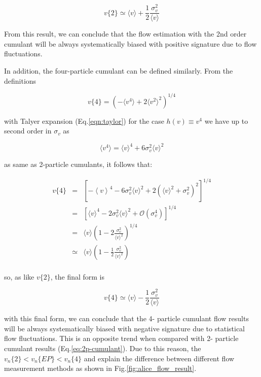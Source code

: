\begin{equation}
	v\{2\} \simeq \langle v \rangle + \frac{1}{2} \frac{\sigma_v^2}{\langle v \rangle}
	\label{eq:2p-cumulant}
\end{equation}

From this result, we can conclude that the flow estimation with the 2nd order cumulant will be always systematically biased with positive signature due to flow fluctuations.

In addition, the four-particle cumulant can be defined similarly. From the definitions

\begin{equation}
	v\{4\} = ( -\langle v^4 \rangle + 2\langle v^2 \rangle ^2 )^{1/4}
\end{equation}

with Talyer expansion (Eq.\ref{eqn:taylor}) for the case $h(v) \equiv v^4$ we have up to second order in $\sigma_v$ as

\begin{equation}
	\langle v^4 \rangle = \langle v \rangle^4 + 6\sigma_v^2\langle v \rangle ^2 
\end{equation}

as same as 2-particle cumulants, it follows that:

\begin{eqnarray}
	v\{4\} &=& \left[ -\left\langle v \right\rangle^4 - 6 \sigma_v^2 \langle v \rangle^2 + 2\left( \langle v \rangle^2 + \sigma_v^2 \right)^2 \right]^{1/4} \\
	&=& \left[ \langle v \rangle^4 - 2 \sigma_v^2 \langle v \rangle ^2 + \mathcal{O}(\sigma_v^4) \right]^{1/4} \\
	&=& \langle v \rangle \left(1 - 2 \frac{\sigma_v^2}{\langle v \rangle^2} \right) ^{1/4} \\
	&\simeq & \langle v \rangle \left( 1 - \frac{1}{2} \frac{\sigma_v^2}{\langle v \rangle^2} \right)	\\
\end{eqnarray}

so, as like $v\{2\}$, the final form is

\begin{equation}
	v\{4\} \simeq \langle v \rangle - \frac{1}{2} \frac{\sigma_v^2}{\langle v \rangle} 
\end{equation}
\smallskip

with this final form, we can conclude that the 4- particle cumulant flow results will be always systematically biased with negative signature due to statistical flow fluctuations. This is an opposite trend when compared with 2- particle cumulant results (Eq.\ref{eq:2p-cumulant}). Due to this reason, the $v_n\{2\} < v_n\{EP\} < v_n\{4\}$ and explain the difference between different flow measurement methods as shown in Fig.\ref{fig:alice_flow_result}.



